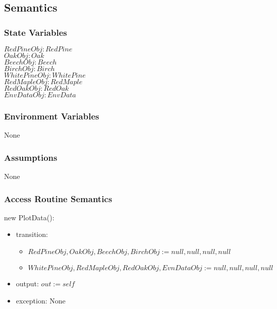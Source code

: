 \documentclass[12pt, titlepage]{article}
\begin{document}
\newpage

\subsection{Semantics}

\subsubsection{State Variables}
$\mathit{RedPineObj: RedPine}$\\
$\mathit{OakObj: Oak}$\\
$\mathit{BeechObj: Beech}$\\
\renewcommand{\attr}{Birch}
$\mathit{\attr Obj: \attr}$\\
\renewcommand{\attr}{WhitePine}
$\mathit{\attr Obj: \attr}$\\
\renewcommand{\attr}{RedMaple}
$\mathit{\attr Obj: \attr}$\\
\renewcommand{\attr}{RedOak}
$\mathit{\attr Obj: \attr}$\\
\renewcommand{\attr}{EnvData}
$\mathit{\attr Obj: \attr}$\\

\subsubsection{Environment Variables}
None

\subsubsection{Assumptions}
None

\subsubsection{Access Routine Semantics}

\noindent new PlotData():
\begin{itemize}
\item transition: 
\begin{itemize}
\item $\mathit{RedPineObj, OakObj, BeechObj, 
BirchObj := null, null, null, null}$

\item $\mathit{WhitePineObj, RedMapleObj, RedOakObj, EvnDataObj
:= null, null, null, null}$
\end{itemize}

\item output: $\mathit{out := self}$
\item exception: None 
\end{itemize}
\end{document}
